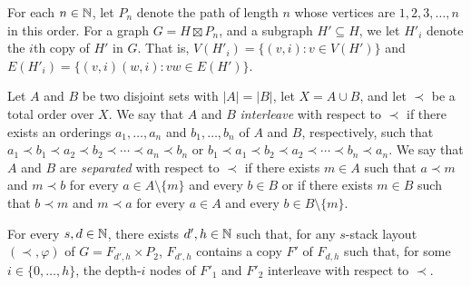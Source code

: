 \documentclass[kpfonts]{patmorin}
\begin{document}
For each $n\in\mathbb{N}$, let $P_n$ denote the path of length $n$ whose vertices are $1,2,3,\ldots,n$ in this order.  For a graph $G=H\boxtimes P_n$, and a subgraph $H'\subseteq H$, we let $H'_i$ denote the $i$th copy of $H'$ in $G$.  That is, $V(H'_i)=\{(v,i):v\in V(H')\}$ and $E(H'_i)=\{(v,i)(w,i): vw\in E(H')\}$.

Let $A$ and $B$ be two disjoint sets with $|A|=|B|$, let $X=A\cup B$, and let $\prec$ be a total order over $X$.  We say that $A$ and $B$ \emph{interleave} with respect to $\prec$ if there exists an orderings $a_1,\ldots,a_n$ and $b_1,\ldots,b_n$ of $A$ and $B$, respectively, such that $a_1\prec b_1\prec a_2\prec b_2\prec\cdots\prec a_n\prec b_n$ or $b_1\prec a_1\prec b_2\prec a_2\prec\cdots\prec b_n\prec a_n$.  We say that $A$ and $B$ are \emph{separated} with respect to $\prec$ if there exists $m\in A$ such that $a\prec m$ and $m\prec b$ for every $a\in A\setminus\{m\}$ and every $b\in B$ or if there exists $m\in B$ such that $b\prec m$ and $m\prec a$ for every $a\in A$ and every $b\in B\setminus\{m\}$.

\begin{clm}
  For every $s,d\in\mathbb{N}$, there exists $d',h\in\mathbb{N}$ such that, for any $s$-stack layout $(\prec,\varphi)$ of $G=F_{d',h}\times P_2$, $F_{d',h}$ contains a copy $F'$ of $F_{d,h}$ such that, for some $i\in\{0,\ldots,h\}$, the depth-$i$ nodes of $F'_1$ and $F'_2$ interleave with respect to $\prec$.
\end{clm}
\end{document}
